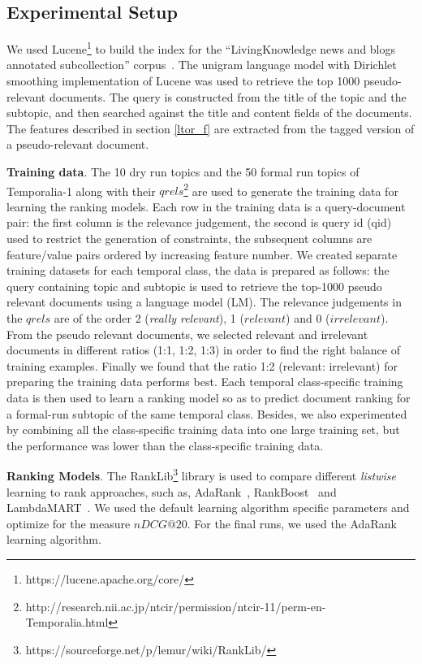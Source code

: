 \documentclass{sig-alternate}
\begin{document}
\subsection{Experimental Setup}
\label{setup}
We used Lucene\footnote{https://lucene.apache.org/core/} to build the index for the ``LivingKnowledge news and blogs annotated subcollection'' corpus~\cite{mioverview}. The unigram language model with Dirichlet smoothing implementation of Lucene was used to retrieve the top 1000 pseudo-relevant documents. The query is constructed from the title of the topic and the subtopic, and then searched against the title and content fields of the documents. The features described in section \ref{ltor_f} are extracted from the tagged version of a pseudo-relevant document.

\textbf{Training data}. The 10 dry run topics and the 50 formal run topics of Temporalia-1 along with their $qrels$\footnote{http://research.nii.ac.jp/ntcir/permission/ntcir-11/perm-en-Temporalia.html} are used to generate the training data for learning the ranking models. Each row in the training data is a query-document pair: the first column is the relevance judgement, the second is query id (qid) used to restrict the generation of constraints, the subsequent columns are feature/value pairs ordered by increasing feature number. We created separate training datasets for each temporal class, the data is prepared as follows: the query containing topic and subtopic is used to retrieve the top-1000 pseudo relevant documents using a language model (LM). The relevance judgements in the $qrels$ are of the order 2 (\textit{really relevant}), 1 ($relevant$) and 0 ($irrelevant$). From the pseudo relevant documents, we selected relevant and irrelevant documents in different ratios (1:1, 1:2, 1:3) in order to find the right balance of training examples. Finally we found that the ratio 1:2 (relevant: irrelevant) for preparing the training data performs best. Each temporal class-specific training data is then used to learn a ranking model so as to predict document ranking for a formal-run subtopic of the same temporal class. Besides, we also experimented by combining all the class-specific training data into one large training set, but the performance was lower than the class-specific training data.

\textbf{Ranking Models}. The RankLib\footnote{https://sourceforge.net/p/lemur/wiki/RankLib/} library is used to compare different \textit{listwise} learning to rank approaches, such as, AdaRank~\cite{adarank}, RankBoost~\cite{rankboost} and LambdaMART~\cite{lambdamart}. We used the default learning algorithm specific parameters and optimize for the measure $nDCG@20$. For the final runs, we used the AdaRank learning algorithm.
\end{document}

